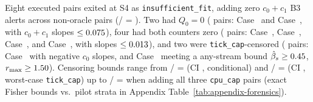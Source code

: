\documentclass[11pt]{article}
\newcommand{\CaseRef}[1]{Case~#1}
\begin{document}
Eight executed pairs exited at S4 as \texttt{insufficient\_fit}, adding zero $c_0+c_1$ B3 alerts across \BenchBThreeAllExecDenom{} non-oracle pairs (\BenchBThreeAllExecN{}/\BenchBThreeAllExecDenom{} = \BenchBThreeAllExecPct{}). Two had $Q_0=0$ (\BenchFitQZeroN{} pairs: \CaseRef{\BenchPosOneZeroZero{}} and \CaseRef{\BenchPosOneThreeOne{}}, with $c_0+c_1$ slopes $\le 0.075{}$), four had both counters zero (\BenchFitBothZeroN{} pairs: \CaseRef{\BenchPosFiveNine{}}, \CaseRef{\BenchPosOneZeroSix{}}, \CaseRef{\BenchPosOneFourZero{}}, and \CaseRef{\BenchPosOneSixZero{}}, with slopes $\le 0.013{}$), and two were \texttt{tick\_cap}-censored (\BenchFitTickCapN{} pairs: \CaseRef{\BenchPosFiveFive{}} with negative $c_0$ slopes, and \CaseRef{\BenchPosOneFiveEight{}} meeting a \BenchCensorTolPct{} any-stream bound $\hat{\beta}_s \ge 0.45{}$, $r_{\max} \ge 1.50{}$).
Censoring bounds range from \BenchCensorCondN{}/\BenchCensorDenom{} = \BenchCensorCondPct{} (CI \BenchCensorCondCI{}, conditional) and \BenchCensorWorstN{}/\BenchCensorDenom{} = \BenchCensorWorstPct{} (CI \BenchCensorWorstCI{}, worst-case \texttt{tick\_cap}) up to \BenchCensorCpuCapTotalN{}/\BenchCensorDenom{} = \BenchCensorCpuCapPct{} when adding all three \texttt{cpu\_cap} pairs (exact Fisher bounds vs.\ pilot strata in Appendix Table~\ref{tab:appendix-forensics}).
\end{document}
